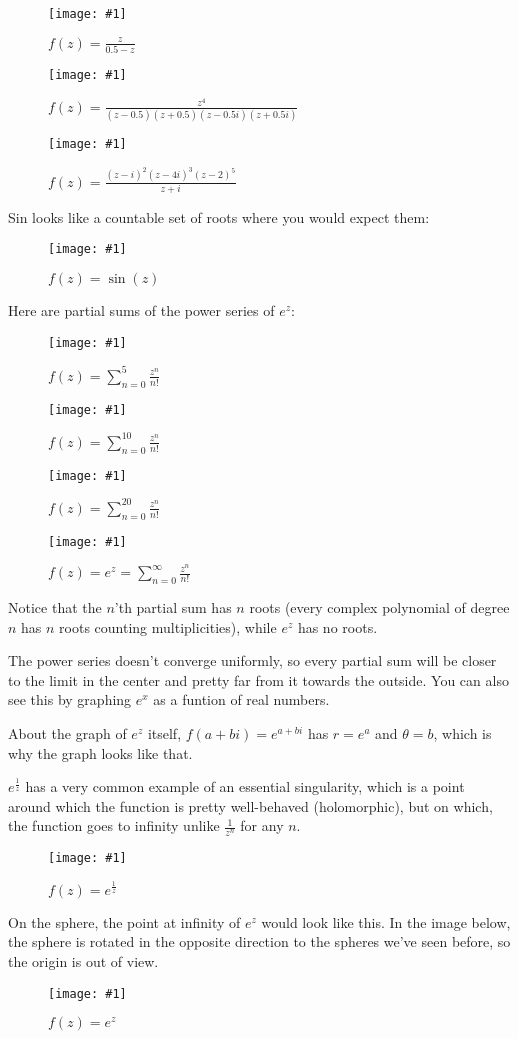 \documentclass[xhtml, mathjax]{article}
\newcommand{\singleimage}[2] {
  \begin{figure}
    \centering
    \texttt{[image: \#1]}\par
    #2
  \end{figure}
}
\begin{document}
    \singleimage{sphere_poly_1.gif}{$f(z)=\frac{z}{0.5-z}$}

    \singleimage{sphere_poly_3.gif}{$f(z)=\frac{z^4}{(z - 0.5)(z + 0.5)(z -
    0.5i)(z + 0.5i)}$}

    \singleimage{poly_6.gif}{$f(z)=\frac{(z-i)^2(z-4i)^3(z-2)^5}{z+i}$}

    Sin looks like a countable set of roots where you would expect them:

    \singleimage{sin.gif}{$f(z)=\sin(z)$}

    Here are partial sums of the power series of $e^z$:

    \singleimage{exp_sum_to_5.gif}{$f(z) = \sum_{n=0}^5 \frac{z^n}{n!}$}

    \singleimage{exp_sum_to_10.gif}{$f(z) = \sum_{n=0}^{10} \frac{z^n}{n!}$}

    \singleimage{exp_sum_to_20.gif}{$f(z) = \sum_{n=0}^{20} \frac{z^n}{n!}$}

    \singleimage{exp.gif}{$f(z) = e^z = \sum_{n=0}^\infty \frac{z^n}{n!}$}

    Notice that the $n$'th partial sum has $n$ roots (every complex polynomial
    of degree $n$ has $n$ roots counting multiplicities), while $e^z$ has no
    roots.

    The power series doesn't converge uniformly, so every partial sum will be
    closer to the limit in the center and pretty far from it towards the
    outside. You can also see this by graphing $e^x$ as a funtion of real
    numbers.

    About the graph of $e^z$ itself, $f(a+bi) = e^{a+bi}$ has $r = e^a$ and
    $\theta = b$, which is why the graph looks like that.

    $e^{\frac{1}{z}}$ has a very common example of an essential singularity,
    which is a point around which the function is pretty well-behaved
    (holomorphic), but on which, the function goes to infinity unlike
    $\frac{1}{z^n}$ for any $n$.

    \singleimage{exp_inv.gif}{$f(z)=e^{\frac{1}{z}}$}

    On the sphere, the point at infinity of $e^z$ would look like this. In the
    image below, the sphere is rotated in the opposite direction to the spheres
    we've seen before, so the origin is out of view.

    \singleimage{exp_inv_sphere.gif}{$f(z)=e^{z}$}

\end{document}

